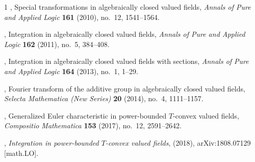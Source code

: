 \documentclass[12pt]{amsart}
\theoremstyle{plain}
\theoremstyle{definition}
\theoremstyle{remark}
\numberwithin{equation}{section}
\theoremstyle{plain}
\newcommand{\0}{\emptyset}
\begin{document}
\begin{thebibliography}{1}
\bysame, {Special transformations in algebraically closed valued fields},
  {\em Annals of Pure and Applied Logic} \textbf{161} (2010), no.~12, 1541--1564.

\bysame, {Integration in algebraically closed valued fields}, {\em Annals of
  Pure and Applied Logic} \textbf{162} (2011), no.~5, 384--408.

\bysame, {Integration in algebraically closed valued fields with
  sections}, {\em Annals of Pure and Applied Logic} \textbf{164} (2013), no.~1,
  1--29.

\bysame, {{F}ourier transform of the additive group in algebraically
  closed valued fields}, {\em Selecta Mathematica (New Series)} \textbf{20} (2014), no.~4,
  1111--1157.

\bysame, {Generalized {E}uler characteristic in power-bounded {$T$}-convex
  valued fields}, {\em Compositio Mathematica} \textbf{153} (2017), no.~12,
  2591--2642.

\bysame, \emph{Integration in power-bounded {$T$}-convex valued fields},
  (2018), arXiv:1808.07129 [math.LO].

\end{thebibliography}
\end{document}

